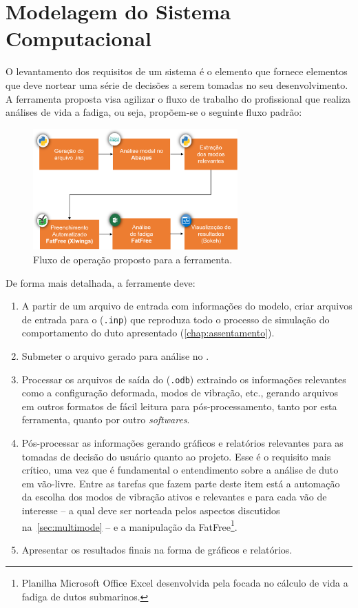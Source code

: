 \chapter{Modelagem do Sistema Computacional}\label{sec:software}

O levantamento dos requisitos de um sistema é o elemento que fornece elementos que deve nortear uma série de decisões a serem tomadas no seu desenvolvimento. A ferramenta proposta visa agilizar o fluxo de trabalho do profissional que realiza análises de vida a fadiga, ou seja, propõem-se o seguinte fluxo padrão:

\begin{figure}[!ht]
    \centering
    \caption{Fluxo de operação proposto para a ferramenta.}\label{fig:workflow}
    \includegraphics[width=0.7\textwidth]{imagens/workflow}
\end{figure}

De forma mais detalhada, a ferramente deve:

\begin{enumerate}
    \item A partir de um arquivo de entrada com informações do modelo, criar arquivos de entrada para o \abaqus (\texttt{.inp}) que reproduza todo o processo de simulação do comportamento do duto apresentado (\autoref{chap:assentamento}).
    \item Submeter o arquivo gerado para análise no \abaqus.\@
    \item Processar os arquivos de saída do \abaqus (\texttt{.odb}) extraindo os informações relevantes como a configuração deformada, modos de vibração, etc., gerando arquivos em outros formatos de fácil leitura para pós-processamento, tanto por esta ferramenta, quanto por outro \textit{softwares}.
    \item Pós-processar as informações gerando gráficos e relatórios relevantes para as tomadas de decisão do usuário quanto ao projeto. Esse é o requisito mais crítico, uma vez que é fundamental o entendimento sobre a análise de duto em vão-livre. Entre as tarefas que fazem parte deste item está a automação da escolha dos modos de vibração ativos e relevantes e para cada vão de interesse -- a qual deve ser norteada pelos aspectos discutidos na~\autoref{sec:multimode} -- e a manipulação da FatFree\footnote{Planilha Microsoft Office Excel desenvolvida pela \dnv focada no cálculo de vida a fadiga de dutos submarinos.}.
    \item Apresentar os resultados finais na forma de gráficos e relatórios.
\end{enumerate}

